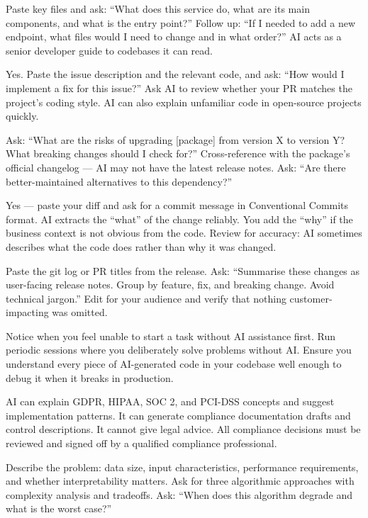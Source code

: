 {Paste key files and ask: ``What does this service do, what are its main components,
and what is the entry point?''
Follow up: ``If I needed to add a new endpoint, what files would I need to change
and in what order?''
AI acts as a senior developer guide to codebases it can read.}

{Yes.
Paste the issue description and the relevant code, and ask: ``How would I implement
a fix for this issue?''
Ask AI to review whether your PR matches the project's coding style.
AI can also explain unfamiliar code in open-source projects quickly.}

{Ask: ``What are the risks of upgrading [package] from version X to version Y?
What breaking changes should I check for?''
Cross-reference with the package's official changelog --- AI may not have the latest
release notes.
Ask: ``Are there better-maintained alternatives to this dependency?''}

{Yes --- paste your diff and ask for a commit message in Conventional Commits format.
AI extracts the ``what'' of the change reliably.
You add the ``why'' if the business context is not obvious from the code.
Review for accuracy: AI sometimes describes what the code does rather than why it
was changed.}

{Paste the git log or PR titles from the release.
Ask: ``Summarise these changes as user-facing release notes. Group by feature, fix,
and breaking change. Avoid technical jargon.''
Edit for your audience and verify that nothing customer-impacting was omitted.}

{Notice when you feel unable to start a task without AI assistance first.
Run periodic sessions where you deliberately solve problems without AI.
Ensure you understand every piece of AI-generated code in your codebase well enough
to debug it when it breaks in production.}

{AI can explain GDPR, HIPAA, SOC 2, and PCI-DSS concepts and suggest implementation
patterns.
It can generate compliance documentation drafts and control descriptions.
It cannot give legal advice.
All compliance decisions must be reviewed and signed off by a qualified compliance
professional.}

{Describe the problem: data size, input characteristics, performance requirements,
and whether interpretability matters.
Ask for three algorithmic approaches with complexity analysis and tradeoffs.
Ask: ``When does this algorithm degrade and what is the worst case?''}

